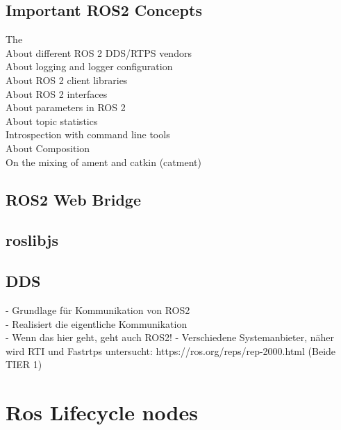 	\subsection{Important ROS2 Concepts}
	\label{Grundlagen:ROS2:Concepts}

		
		The \\
		About different ROS 2 DDS/RTPS vendors\\	
		About logging and logger configuration\\
		About ROS 2 client libraries\\
		About ROS 2 interfaces\\
		About parameters in ROS 2\\
		About topic statistics\\
		Introspection with command line tools\\
		About Composition\\
		On the mixing of ament and catkin (catment)\\

	\subsection{ROS2 Web Bridge}
	\label{Grundlagen:ROS2:2WebBridge}
		
	\subsection{roslibjs}
	\label{Grundlagen:ROS2:RosLibJS}
	
	

	\subsection{DDS}
	\label{Grundlagen:DDS}
		- Grundlage für Kommunikation von ROS2\\
		- Realisiert die eigentliche Kommunikation\\
		- Wenn das hier geht, geht auch ROS2!
		- Verschiedene Systemanbieter, näher wird RTI und Fastrtps untersucht: https://ros.org/reps/rep-2000.html  (Beide TIER 1)
		
	
	\section{Ros Lifecycle nodes}
	\label{Grundlagen:ROS2:Lifecycle}

